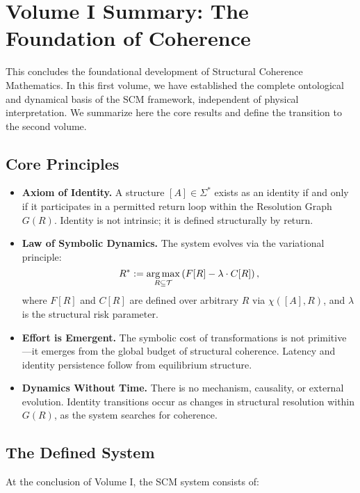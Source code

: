 \section{Volume I Summary: The Foundation of Coherence}

This concludes the foundational development of Structural Coherence Mathematics. In this first volume, we have established the complete ontological and dynamical basis of the SCM framework, independent of physical interpretation. We summarize here the core results and define the transition to the second volume.

\subsection*{Core Principles}

\begin{itemize}
    \item \textbf{Axiom of Identity.} A structure $[A] \in \Sigma^*$ exists as an identity if and only if it participates in a permitted return loop within the Resolution Graph $G(R)$. Identity is not intrinsic; it is defined structurally by return.

    \item \textbf{Law of Symbolic Dynamics.} The system evolves via the variational principle:
    \[
    R^* := \operatorname*{arg\,max}_{R \subseteq \mathcal{T}} \left( F[R] - \lambda \cdot C[R] \right),
    \]
    where $F[R]$ and $C[R]$ are defined over arbitrary $R$ via $\chi([A], R)$, and $\lambda$ is the structural risk parameter.

    \item \textbf{Effort is Emergent.} The symbolic cost of transformations is not primitive—it emerges from the global budget of structural coherence. Latency and identity persistence follow from equilibrium structure.

    \item \textbf{Dynamics Without Time.} There is no mechanism, causality, or external evolution. Identity transitions occur as changes in structural resolution within $G(R)$, as the system searches for coherence.
\end{itemize}

\subsection*{The Defined System}

At the conclusion of Volume I, the SCM system consists of:

